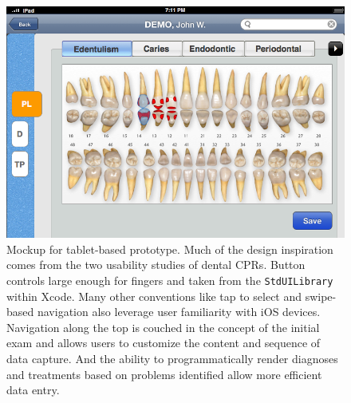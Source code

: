 \documentclass[11pt]{article}
\begin{document}
\begin{figure}[h!t]
\begin{center}
\includegraphics[width=\textwidth]{wireframe.png}
\end{center}
\caption{Mockup for tablet-based prototype. Much of the design inspiration comes from the two usability studies of dental CPRs. Button controls large enough for fingers and taken from the \texttt{StdUILibrary} within Xcode. Many other conventions like tap to select and swipe-based navigation also leverage user familiarity with iOS devices. Navigation along the top is couched in the concept of the initial exam and allows users to customize the content and sequence of data capture. And the ability to programmatically render diagnoses and treatments based on problems identified allow more efficient data entry.}
\end{figure}

\newpage
\end{document}
